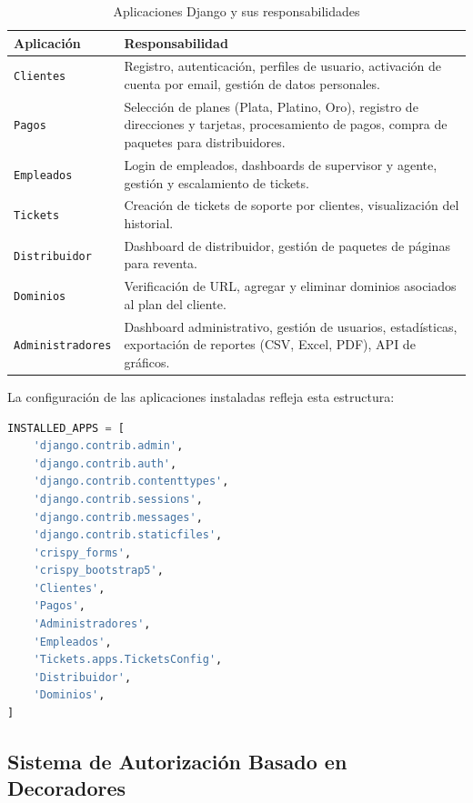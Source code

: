 \documentclass[12pt, a4paper]{article}
\begin{document}
\begin{table}[h]
\centering
\caption{Aplicaciones Django y sus responsabilidades}
\begin{tabularx}{\textwidth}{l X}
    \toprule
    \textbf{Aplicación} & \textbf{Responsabilidad} \\
    \midrule
    \texttt{Clientes} & Registro, autenticación, perfiles de usuario, activación de cuenta por email, gestión de datos personales. \\
    \texttt{Pagos} & Selección de planes (Plata, Platino, Oro), registro de direcciones y tarjetas, procesamiento de pagos, compra de paquetes para distribuidores. \\
    \texttt{Empleados} & Login de empleados, dashboards de supervisor y agente, gestión y escalamiento de tickets. \\
    \texttt{Tickets} & Creación de tickets de soporte por clientes, visualización del historial. \\
    \texttt{Distribuidor} & Dashboard de distribuidor, gestión de paquetes de páginas para reventa. \\
    \texttt{Dominios} & Verificación de URL, agregar y eliminar dominios asociados al plan del cliente. \\
    \texttt{Administradores} & Dashboard administrativo, gestión de usuarios, estadísticas, exportación de reportes (CSV, Excel, PDF), API de gráficos. \\
    \bottomrule
\end{tabularx}
\end{table}

La configuración de las aplicaciones instaladas refleja esta estructura:

\begin{lstlisting}[language=Python, caption={INSTALLED\_APPS en settings.py}]
INSTALLED_APPS = [
    'django.contrib.admin',
    'django.contrib.auth',
    'django.contrib.contenttypes',
    'django.contrib.sessions',
    'django.contrib.messages',
    'django.contrib.staticfiles',
    'crispy_forms',
    'crispy_bootstrap5',
    'Clientes',
    'Pagos',
    'Administradores',
    'Empleados',
    'Tickets.apps.TicketsConfig',
    'Distribuidor',
    'Dominios',
]
\end{lstlisting}

\subsection{Sistema de Autorización Basado en Decoradores}
\label{subsec:decorators}
\end{document}
